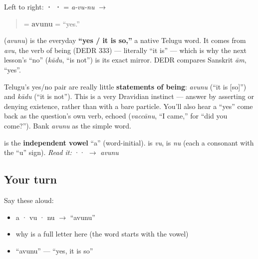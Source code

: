 Left to right: \textbf{ ·  · } = \emph{a-vu-nu} $\to$

\begin{quote}
\textbf{} = \textbf{avunu} = \textquotedblleft{}yes.\textquotedblright{}
\end{quote}

\begin{cousinweb}
\textbf{} (\emph{avunu}) is the everyday \textbf{\textquotedblleft{}yes / it is so,\textquotedblright{}} a native Telugu word. It comes from \emph{avu}, the verb of being (DEDR 333) — literally \textquotedblleft{}it is\textquotedblright{} — which is why the next lesson's \textquotedblleft{}no\textquotedblright{} (\emph{kādu}, \textquotedblleft{}is not\textquotedblright{}) is its exact mirror. DEDR compares Sanskrit \emph{ām}, \textquotedblleft{}yes\textquotedblright{}.
\end{cousinweb}

\begin{grammarlens}[title={Grammar Lens: yes and no as \textquotedblleft{}it is\textquotedblright{} / \textquotedblleft{}it is not\textquotedblright{}}]
Telugu's yes/no pair are really little \textbf{statements of being}: \emph{avunu} (\textquotedblleft{}it is {[}so{]}\textquotedblright{}) and \emph{kādu} (\textquotedblleft{}it is not\textquotedblright{}). This is a very Dravidian instinct — answer by asserting or denying existence, rather than with a bare particle. You'll also hear a \textquotedblleft{}yes\textquotedblright{} come back as the question's own verb, echoed (\emph{vaccānu}, \textquotedblleft{}I came,\textquotedblright{} for \textquotedblleft{}did you come?\textquotedblright{}). Bank \emph{avunu} as the simple word.
\end{grammarlens}

\begin{sounds}
 is the \textbf{independent vowel} “a” (word-initial).  is \emph{vu},  is \emph{nu} (each a consonant with the “u” sign). \emph{Read it:} ·· $\to$ \emph{avunu}
\end{sounds}

\subsection*{Your turn}
Say these aloud:

\begin{itemize}
\raggedright
  \item a · vu · nu $\to$ \textquotedblleft{}avunu\textquotedblright{}
  \item why  is a full letter here (the word starts with the vowel)
  \item \textquotedblleft{}avunu\textquotedblright{} — \textquotedblleft{}yes, it is so\textquotedblright{}
\end{itemize}

